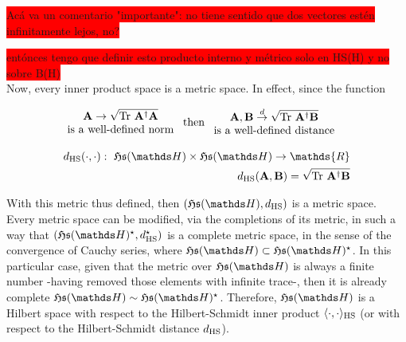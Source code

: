 \documentclass{homework}
\begin{document}
\colorbox{red}{Acá va un comentario "importante": no tiene sentido que dos vectores estén infinitamente lejos, no?} 

\colorbox{red}{entónces tengo que definir esto producto interno y métrico solo en HS(H) y no sobre B(H)} \\

Now, every inner product space is a metric space. In effect, since the function 

\begin{align*}
    \begin{array}{c}
         {\bf A} \rightarrow \sqrt{\textnormal{Tr } {\bf A^\dagger}{\bf A}}  \\
         \textnormal{is a well-defined norm}  
    \end{array} & \textnormal{ then }  \begin{array}{c}
         {\bf A}, {\bf B} \overset{d}{\rightarrow} \sqrt{\textnormal{Tr } {\bf A}^{\dagger} {\bf B}}  \\
         \textnormal{is a well-defined distance}
    \end{array}
\end{align*}

\begin{equation*}
\begin{split}
   d_{\textnormal{HS}}(\cdot, \cdot): \blanky \mathfrak{H}\mathfrak{s}(\hilbert) \times \mathfrak{H}\mathfrak{s}(\hilbert) \rightarrow \mathds{R} \\
   d_{\textnormal{HS}}({\bf A}, {\bf B}) = \sqrt{\textnormal{Tr } {\bf A}^\dagger {\bf B}}
\end{split}
\end{equation*}

With this metric thus defined, then $(\mathfrak{H}\mathfrak{s}(\hilbert), d_{\textnormal{HS}})$ is a metric space. Every metric space can be modified, via the completions of its metric, in such a way that 
$(\mathfrak{H}\mathfrak{s}(\hilbert)^{\star}, d_{\textnormal{HS}}^{\star})$ is a complete metric space, in the sense of the convergence of Cauchy series, where $\mathfrak{H}\mathfrak{s}(\hilbert) \subset \mathfrak{H}\mathfrak{s}(\hilbert)^{\star}$. In this particular case, given that the metric over $\mathfrak{H}\mathfrak{s}(\hilbert)$ is always a finite number -having removed those elements with infinite trace-, then it is already complete $\mathfrak{H}\mathfrak{s}(\hilbert) \sim \mathfrak{H}\mathfrak{s}(\hilbert)^{\star}$. Therefore, $\mathfrak{H}\mathfrak{s}(\hilbert)$ is a Hilbert space with respect to the Hilbert-Schmidt inner product $\langle \cdot , \cdot \rangle_{\textnormal{HS}}$ (or with respect to the Hilbert-Schmidt distance $d_{\textnormal{HS}}$). \\
\end{document}
